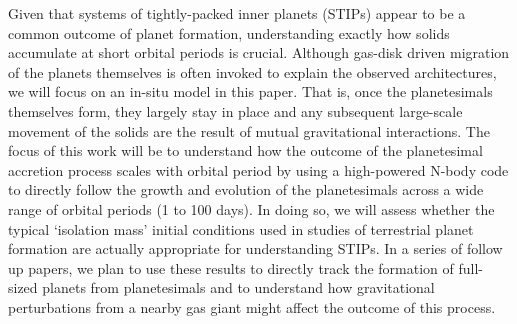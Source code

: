 \documentclass[twocolumn]{aastex63}
\begin{document}
Given that systems of tightly-packed inner planets (STIPs) appear to be a common outcome of planet formation, understanding exactly how solids accumulate at short orbital periods is crucial. Although gas-disk driven migration of the planets themselves is often invoked to explain the observed architectures, we will focus on an in-situ model in this paper. That is, once the planetesimals themselves form, they largely stay in place and any subsequent large-scale movement of the solids are the result of mutual gravitational interactions. The focus of this work will be to understand how the outcome of the planetesimal accretion process scales with orbital period by using a high-powered N-body code to directly follow the growth and evolution of the planetesimals across a wide range of orbital periods (1 to 100 days). In doing so, we will assess whether the typical `isolation mass' initial conditions used in studies of terrestrial planet formation are actually appropriate for understanding STIPs. In a series of follow up papers, we plan to use these results to directly track the formation of full-sized planets from planetesimals and to understand how gravitational perturbations from a nearby gas giant might affect the outcome of this process.


\end{document}
